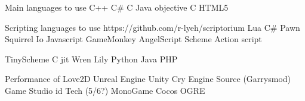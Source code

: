 \documentclass[11pt,a4paper,titlepage]{article}
\begin{document}
		
		Main languages to use
			C++
			C\#
			C
			Java
			objective C
			HTML5
			

		Scripting languages to use https://github.com/r-lyeh/scriptorium
			Lua
			C\# %
			Pawn
			Squirrel
			Io
			Javascript
			GameMonkey
			AngelScript
			Scheme
			Action script

			TinyScheme
			C jit
			Wren
			Lily
			Python
			Java
			PHP
	
		Performance of
			Love2D
			Unreal 
			Engine 
			Unity 
			Cry Engine 
			Source (Garrysmod)
			Game Studio
			id Tech (5/6?)
			MonoGame
			Cocos
			OGRE
			
\newpage
\printbibliography{}
\end{document}
